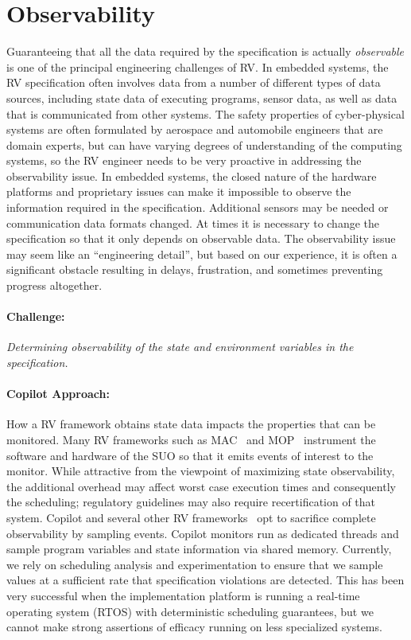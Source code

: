 \section{Observability}\label{sec:observ} 
Guaranteeing that all the data required by the specification is
actually \emph{observable} is one of the principal engineering
challenges of RV. In embedded systems, the RV specification often
involves data from a number of different types of data sources,
including state data of executing programs, sensor data, as well as
data that is communicated from other systems.  The safety
properties of cyber-physical systems are often formulated by aerospace
and automobile engineers that are domain experts, but can have
varying degrees of understanding of the computing systems, so the RV
engineer needs to be very proactive in addressing the observability
issue. In embedded systems, the closed nature of the hardware
platforms and proprietary  issues can make it impossible to observe the
information required in the specification.  Additional sensors may be
needed or communication data formats changed.  At times it is
necessary to change the specification so that it only depends on
observable data.  The observability issue may seem like an
``engineering detail'', but based on our experience,  it is often a
significant obstacle resulting in  delays, frustration, and sometimes
preventing progress altogether.


\paragraph{Challenge:} \emph{Determining observability of the state and environment variables in the
specification.}  


  \paragraph{Copilot Approach:} How a RV framework obtains state data impacts the properties that
  can be monitored. Many RV frameworks such as MAC~\cite{KimLKS04}
  and MOP~\cite{ChenR05} instrument the software and hardware of the
  SUO so that it emits events of interest to the monitor.  While
  attractive from the viewpoint of maximizing state observability, the
  additional overhead may affect  worst case
  execution times and consequently the scheduling; 
  regulatory guidelines may  also require recertification of that system.
  Copilot and several other RV frameworks~\cite{sampling,Kane15,borzoo} opt to sacrifice complete
  observability by sampling events.  Copilot monitors run as dedicated
  threads and sample program variables and state information via shared
  memory.  Currently, we rely on scheduling analysis and experimentation to ensure that we sample values at a
  sufficient rate that specification violations are detected. This has
  been very successful when the implementation platform is running a
  real-time operating system (RTOS) with deterministic scheduling
  guarantees, but we cannot make strong assertions of efficacy running on less
  specialized systems.

